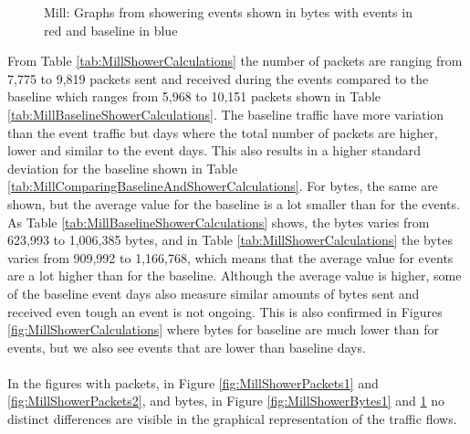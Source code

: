 \begin{figure}[H]
\begin{subfigure}[b]{0.47\textwidth}
    \end{subfigure}
        \begin{subfigure}[b]{0.47\textwidth}
        \centering
    \end{subfigure}
    \begin{subfigure}[b]{0.47\textwidth}
        \centering
    \end{subfigure}
    \begin{subfigure}[b]{0.47\textwidth}
        \centering
    \end{subfigure}
    \hspace{0.6cm}
    \begin{subfigure}[b]{0.47\textwidth}
    \centering
        \end{subfigure}
    \caption{Mill: Graphs from showering events shown in bytes with events in red and baseline in blue}
    \label{fig:MillShowerBytes2}
\end{figure}

From Table \ref{tab:MillShowerCalculations} the number of packets are ranging from 7,775 to 9,819 packets sent and received during the events compared to the baseline which ranges from 5,968 to 10,151 packets shown in Table \ref{tab:MillBaselineShowerCalculations}. The baseline traffic have more variation than the event traffic but days where the total number of packets are higher, lower and similar to the event days. This also results in a higher standard deviation for the baseline shown in Table \ref{tab:MillComparingBaselineAndShowerCalculations}. For bytes, the same are shown, but the average value for the baseline is a lot smaller than for the events. As Table \ref{tab:MillBaselineShowerCalculations} shows, the bytes varies from 623,993 to 1,006,385 bytes, and in Table \ref{tab:MillShowerCalculations} the bytes varies from 909,992 to 1,166,768, which means that the average value for events are a lot higher than for the baseline. Although the average value is higher, some of the baseline event days also measure similar amounts of bytes sent and received even tough an event is not ongoing. This is also confirmed in Figures \ref{fig:MillShowerCalculations} where bytes for baseline are much lower than for events, but we also see events that are lower than baseline days. 
\\\\
In the figures with packets, in Figure \ref{fig:MillShowerPackets1} and \ref{fig:MillShowerPackets2}, and bytes, in Figure \ref{fig:MillShowerBytes1} and \ref{fig:MillShowerBytes2} no distinct differences are visible in the graphical representation of the traffic flows. 

